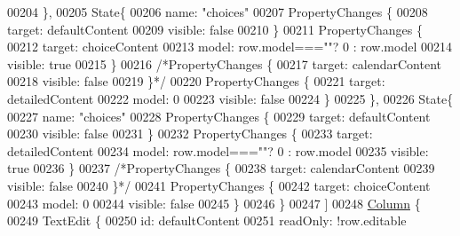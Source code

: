 \begin{DoxyCode}
00204                     \},
00205                     State\{
00206                         name: \textcolor{stringliteral}{"choices"}
00207                         PropertyChanges \{
00208                             target: defaultContent
00209                             visible: \textcolor{keyword}{false}
00210                         \}
00211                         PropertyChanges \{
00212                             target: choiceContent
00213                             model: row.model===\textcolor{stringliteral}{""}? 0  : row.model
00214                             visible: \textcolor{keyword}{true}
00215                         \}
00216                         \textcolor{comment}{/*PropertyChanges \{}
00217 \textcolor{comment}{                            target: calendarContent}
00218 \textcolor{comment}{                            visible: false}
00219 \textcolor{comment}{                        \}*/}
00220                         PropertyChanges \{
00221                             target: detailedContent
00222                             model: 0
00223                             visible: \textcolor{keyword}{false}
00224                         \}
00225                     \},
00226                     State\{
00227                         name: \textcolor{stringliteral}{"choices"}
00228                         PropertyChanges \{
00229                             target: defaultContent
00230                             visible: \textcolor{keyword}{false}
00231                         \}
00232                         PropertyChanges \{
00233                             target: detailedContent
00234                             model: row.model===\textcolor{stringliteral}{""}? 0  : row.model
00235                             visible: \textcolor{keyword}{true}
00236                         \}
00237                         \textcolor{comment}{/*PropertyChanges \{}
00238 \textcolor{comment}{                            target: calendarContent}
00239 \textcolor{comment}{                            visible: false}
00240 \textcolor{comment}{                        \}*/}
00241                         PropertyChanges \{
00242                             target: choiceContent
00243                             model: 0
00244                             visible: \textcolor{keyword}{false}
00245                         \}
00246                     \}
00247                 ]
00248                 \hyperlink{classColumn}{Column} \{
00249                     TextEdit \{
00250                         \textcolor{keywordtype}{id}: defaultContent
00251                         readOnly:  !row.editable

\end{DoxyCode}

